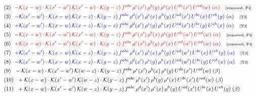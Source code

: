 \documentclass[9pt]{article}
\begin{document}
\begin{align}
&\quad\text{(2)}\ \ \textcolor{red}{-\mathcal{K}(x-w)\cdot \mathcal{K}(x'-w')\, \mathcal{K}(x'-w)\cdot \mathcal{K}(y-z)\, f^{abc}\, \rho^{e}(x')\,\rho^{b}(y)\,\rho^{c}(x)\,U^{de}(x')\,U^{ad}(w)\;(\alpha)}\quad\text{\scriptsize[removed, F4]}\notag\\
&\quad\text{(3)}\ \ \textcolor{blue}{-\mathcal{K}(x'-w')\cdot\mathcal{K}(x-w)\,\mathcal{K}(x-z)\cdot\mathcal{K}(y-z)\, f^{abc}\,\rho^{d}(x')\,\rho^{e}(x)\,\rho^{h}(y)\,U^{ad}(x')\,U^{be}(x)\,U^{ch}(y)\;(\alpha)}\quad\text{\scriptsize[T3]}\notag\\
&\quad\text{(4)}\ \ \textcolor{blue}{+\mathcal{K}(x'-w')\cdot\mathcal{K}(x-w)\,\mathcal{K}(x-z)\cdot\mathcal{K}(y-z)\, f^{abc}\,\rho^{d}(x')\,\rho^{e}(y)\,\rho^{h}(x)\,U^{ad}(x')\,U^{be}(y)\,U^{ch}(x)\;(\alpha)}\quad\text{\scriptsize[T3]}\notag\\
&\quad\text{(5)}\ \ \textcolor{red}{-\mathcal{K}(x-w)\cdot \mathcal{K}(x'-w')\, \mathcal{K}(x'-w)\cdot \mathcal{K}(y-z)\, f^{abc}\, \rho^{e}(x')\,\rho^{b}(x)\,\rho^{c}(y)\,U^{de}(w')\,U^{ad}(w)\;(\alpha)}\quad\text{\scriptsize[removed, F4]}\notag\\
&\quad\text{(6)}\ \ \textcolor{red}{+\mathcal{K}(x-w)\cdot \mathcal{K}(x'-w')\, \mathcal{K}(x'-w)\cdot \mathcal{K}(y-z)\, f^{abc}\, \rho^{e}(x')\,\rho^{b}(y)\,\rho^{c}(x)\,U^{ed}(w')\,U^{ad}(w)\;(\alpha)}\quad\text{\scriptsize[removed, F4]}\notag\\
&\quad\text{(7)}\ \ \textcolor{blue}{+\mathcal{K}(x'-w')\cdot\mathcal{K}(x-w)\,\mathcal{K}(x-z)\cdot\mathcal{K}(y-z)\, f^{abc}\,\rho^{d}(x')\,\rho^{e}(x)\,\rho^{h}(y)\,U^{ad}(w')\,U^{be}(x)\,U^{ch}(y)\;(\alpha)}\quad\text{\scriptsize[T3]}\notag\\
&\quad\text{(8)}\ \ \textcolor{blue}{-\mathcal{K}(x'-w')\cdot\mathcal{K}(x-w)\,\mathcal{K}(x-z)\cdot\mathcal{K}(y-z)\, f^{abc}\,\rho^{d}(x')\,\rho^{e}(y)\,\rho^{h}(x)\,U^{ad}(w')\,U^{be}(y)\,U^{ch}(x)\;(\alpha)}\quad\text{\scriptsize[T3]}\notag\\
&\quad\text{(9)}\ \ - \mathcal{K}(x-w) \cdot \mathcal{K}(x'-w')\, \mathcal{K}(w-z)\cdot \mathcal{K}(y-z)\, f^{abc}\, \rho^{e}(x')\,\rho^{b}(x)\,\rho^{c}(y)\,U^{de}(x')\,U^{ad}(w)\;(\beta)\notag\\
&\quad\text{(10)}\ \ +  \mathcal{K}(x-w) \cdot \mathcal{K}(x'-w')\, \mathcal{K}(w-z)\cdot \mathcal{K}(y-z)\, f^{abc}\, \rho^{e}(x')\,\rho^{b}(y)\,\rho^{c}(x)\,U^{de}(x')\,U^{ad}(w)\;(\beta)\notag\\
&\quad\text{(11)}\ \ + \mathcal{K}(x-w) \cdot \mathcal{K}(x'-w')\, \mathcal{K}(w-z)\cdot \mathcal{K}(y-z)\, f^{abc}\, \rho^{d}(x')\,\rho^{e}(x)\,\rho^{h}(y)\,U^{ad}(x')\,U^{be}(x)\,U^{ch}(y)\;(\beta)\notag\\

\end{align}
\end{document}
